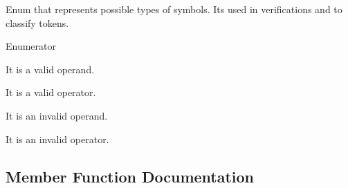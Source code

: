 Enum that represents possible types of symbols. It\textquotesingle{}s used in verifications and to classify tokens. 

\begin{Desc}
\item[Enumerator]\par
\begin{description}
\item[{\em 
O\+P\+E\+R\+A\+ND\hypertarget{classBares_a656cd507b0ddaa049dc7e6548459b6d8a11f3de9b2b548c31805cf34d512ee177}{}\label{classBares_a656cd507b0ddaa049dc7e6548459b6d8a11f3de9b2b548c31805cf34d512ee177}
}]It is a valid operand. \item[{\em 
O\+P\+E\+R\+A\+T\+OR\hypertarget{classBares_a656cd507b0ddaa049dc7e6548459b6d8a986496ca5b23669b8661171566a167c3}{}\label{classBares_a656cd507b0ddaa049dc7e6548459b6d8a986496ca5b23669b8661171566a167c3}
}]It is a valid operator. \item[{\em 
I\+N\+V\+A\+L\+I\+D\+\_\+\+O\+P\+E\+R\+A\+ND\hypertarget{classBares_a656cd507b0ddaa049dc7e6548459b6d8a6bf179afa8f7fba18cf39bc0ca6fe043}{}\label{classBares_a656cd507b0ddaa049dc7e6548459b6d8a6bf179afa8f7fba18cf39bc0ca6fe043}
}]It is an invalid operand. \item[{\em 
I\+N\+V\+A\+L\+I\+D\+\_\+\+O\+P\+E\+R\+A\+T\+OR\hypertarget{classBares_a656cd507b0ddaa049dc7e6548459b6d8a29b8e189abb3870e81dcf17ffcbf1f31}{}\label{classBares_a656cd507b0ddaa049dc7e6548459b6d8a29b8e189abb3870e81dcf17ffcbf1f31}
}]It is an invalid operator. \end{description}
\end{Desc}


\subsection{Member Function Documentation}
